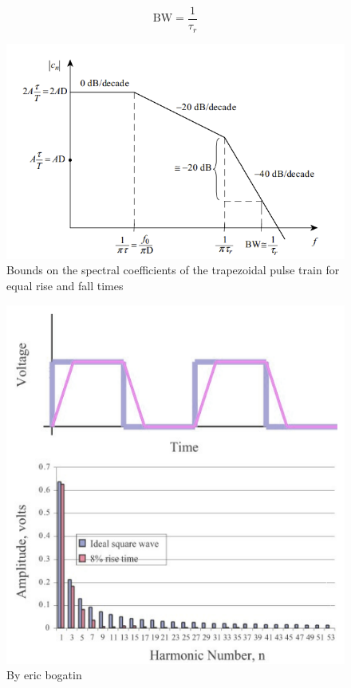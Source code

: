 \documentclass[final]{cubedoc}
\begin{document}
	\[\text{BW} = \frac{1}{τ_r}\]
	
	\begin{figure}[h!]
		\centering
		\includegraphics[keepaspectratio, width = \textwidth]{assets/magnitude_clock.png}
		\caption{Bounds on the spectral coefficients of the trapezoidal pulse train for equal rise and fall times}
	\end{figure}
	
	\begin{figure}[h!]
		\centering
		\includegraphics[keepaspectratio, height = .4\textheight, width = \textwidth]{assets/square_n_trapezoidal.png}
		\caption{By eric bogatin}
	\end{figure}
	
\end{document}
